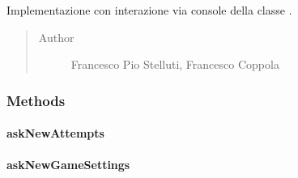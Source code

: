 \documentclass[letterpaper,10pt,italian,openany,oneside]{sphinxmanual}
\begin{document}
\begin{fulllineitems}
\label{\detokenize{source/it/unicam/cs/pa/mastermind/ui/ConsoleStartView:it.unicam.cs.pa.mastermind.ui.ConsoleStartView}}
Implementazione con interazione via console della classe .
\begin{quote}\begin{description}
\item[{Author}] \leavevmode
Francesco Pio Stelluti, Francesco Coppola

\end{description}\end{quote}

\end{fulllineitems}



\subsubsection{Methods}
\label{\detokenize{source/it/unicam/cs/pa/mastermind/ui/ConsoleStartView:methods}}

\paragraph{askNewAttempts}
\label{\detokenize{source/it/unicam/cs/pa/mastermind/ui/ConsoleStartView:asknewattempts}}

\begin{fulllineitems}
\label{\detokenize{source/it/unicam/cs/pa/mastermind/ui/ConsoleStartView:it.unicam.cs.pa.mastermind.ui.ConsoleStartView.askNewAttempts()}}
\end{fulllineitems}



\paragraph{askNewGameSettings}
\label{\detokenize{source/it/unicam/cs/pa/mastermind/ui/ConsoleStartView:asknewgamesettings}}
\end{document}
